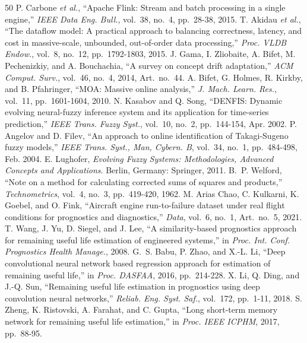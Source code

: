 \documentclass[journal,10pt,twocolumn]{IEEEtran}
\begin{document}
\begin{thebibliography}{50}
P. Carbone \emph{et al.}, ``Apache Flink: Stream and batch processing in a single engine,'' \emph{IEEE Data Eng. Bull.}, vol.\ 38, no.\ 4, pp.\ 28-38, 2015.
T. Akidau \emph{et al.}, ``The dataflow model: A practical approach to balancing correctness, latency, and cost in massive-scale, unbounded, out-of-order data processing,'' \emph{Proc. VLDB Endow.}, vol.\ 8, no.\ 12, pp.\ 1792-1803, 2015.
J. Gama, I. Zliobaite, A. Bifet, M. Pechenizkiy, and A. Bouchachia, ``A survey on concept drift adaptation,'' \emph{ACM Comput. Surv.}, vol.\ 46, no.\ 4, 2014, Art.\ no.\ 44.
A. Bifet, G. Holmes, R. Kirkby, and B. Pfahringer, ``MOA: Massive online analysis,'' \emph{J. Mach. Learn. Res.}, vol.\ 11, pp.\ 1601-1604, 2010.
N. Kasabov and Q. Song, ``DENFIS: Dynamic evolving neural-fuzzy inference system and its application for time-series prediction,'' \emph{IEEE Trans. Fuzzy Syst.}, vol.\ 10, no.\ 2, pp.\ 144-154, Apr. 2002.
P. Angelov and D. Filev, ``An approach to online identification of Takagi-Sugeno fuzzy models,'' \emph{IEEE Trans. Syst., Man, Cybern. B}, vol.\ 34, no.\ 1, pp.\ 484-498, Feb. 2004.
E. Lughofer, \emph{Evolving Fuzzy Systems: Methodologies, Advanced Concepts and Applications}. Berlin, Germany: Springer, 2011.
B.~P. Welford, ``Note on a method for calculating corrected sums of squares and products,'' \emph{Technometrics}, vol.\ 4, no.\ 3, pp.\ 419-420, 1962.
M. Arias Chao, C. Kulkarni, K. Goebel, and O. Fink, ``Aircraft engine run-to-failure dataset under real flight conditions for prognostics and diagnostics,'' \emph{Data}, vol.\ 6, no.\ 1, Art.\ no.\ 5, 2021.
T. Wang, J. Yu, D. Siegel, and J. Lee, ``A similarity-based prognostics approach for remaining useful life estimation of engineered systems,'' in \emph{Proc. Int. Conf. Prognostics Health Manage.}, 2008.
G.~S. Babu, P. Zhao, and X.-L. Li, ``Deep convolutional neural network based regression approach for estimation of remaining useful life,'' in \emph{Proc. DASFAA}, 2016, pp.\ 214-228.
X. Li, Q. Ding, and J.-Q. Sun, ``Remaining useful life estimation in prognostics using deep convolution neural networks,'' \emph{Reliab. Eng. Syst. Saf.}, vol.\ 172, pp.\ 1-11, 2018.
S. Zheng, K. Ristovski, A. Farahat, and C. Gupta, ``Long short-term memory network for remaining useful life estimation,'' in \emph{Proc. IEEE ICPHM}, 2017, pp.\ 88-95.

\end{thebibliography}
\end{document}
